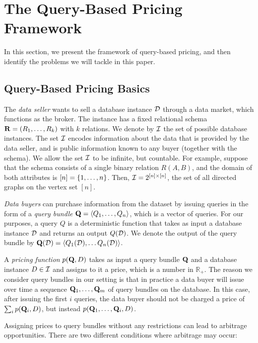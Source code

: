 \section{The Query-Based Pricing Framework}
\label{sec:framework}

In this section, we present the framework of query-based pricing, and then identify the problems we will tackle in this paper. 

\subsection{Query-Based Pricing Basics}

The {\em data seller} wants to sell a database instance $\mathcal{D}$ through a data market, which functions as the  broker. The instance has a fixed relational schema $\mathbf{R} = (R_1, \dots, R_k)$ with $k$ relations. We denote by $\mathcal{I}$ the set of possible database instances. The set $\mathcal{I}$ encodes information about the data that is provided by the data seller, and is public information known to any buyer (together with the schema). We allow the set $\mathcal{I}$ to be infinite, but countable. For example, suppose that the schema consists of a single binary relation $R(A,B)$, and the domain of both attributes is $[n] = \{1, \dots, n\}$. Then, $\mathcal{I} = 2^{[n] \times [n]}$, \ie the set of all directed graphs on the vertex set $[n]$.

{\em Data buyers} can purchase information from the dataset by issuing queries in the form of a {\em query bundle}  $\mathbf{Q}=\langle {Q_1, \hdots, Q_n} \rangle$, which is a vector of queries. For our purposes, a query $Q$ is a deterministic function that takes as input a database instance $\mathcal{D}$ and returns an output $Q(\mathcal{D})$.  
We denote the output of the query bundle by $\mathbf{Q}(\mathcal{D}) = \langle {Q_1(\mathcal{D}), \hdots Q_n(\mathcal{D})} \rangle$. 

A {\em pricing function} $p(\mathbf{Q}, D)$ takes as input a query bundle $\mathbf{Q}$ and a database instance $D \in \mathcal{I}$ and assigns to it a price, which is a number in $ \mathbb{R}_+$. 
The reason we consider query bundles in our setting is that in practice a data buyer will issue over time a sequence $\mathbf{Q}_1, \dots, \mathbf{Q}_m$ of query bundles on the database. In this case, after issuing the first $i$ queries, the data buyer should not be charged a price of $\sum_i p(\mathbf{Q}_i,D)$, but instead $p(\mathbf{Q}_1, \dots, \mathbf{Q}_i, D)$. 

Assigning prices to query bundles without any restrictions can lead to arbitrage opportunities. There are two different conditions where arbitrage may occur:


